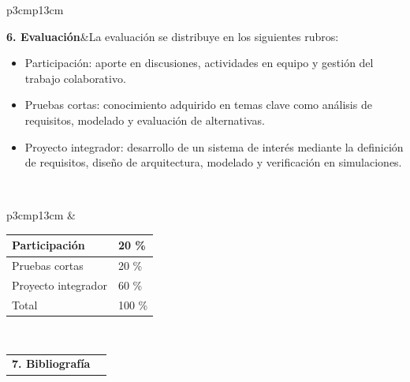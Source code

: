 \documentclass[letterpaper]{article}%
\begin{document}
\begin{tabularx}{\textwidth}{p{3cm}p{13cm}}%
\par\fontsize{12}{14}\selectfont \textbf{\textcolor{parte}{6. Evaluación}}&La evaluación se distribuye en los siguientes rubros:\vspace*{1mm} \newline  \begin{itemize} \item Participación: aporte en discusiones, actividades en equipo y gestión del trabajo colaborativo. \item Pruebas cortas: conocimiento adquirido en temas clave como análisis de requisitos, modelado y evaluación de alternativas. \item Proyecto integrador: desarrollo de un sistema de interés mediante la definición de requisitos, diseño de arquitectura, modelado y verificación en simulaciones. \end{itemize}\\%
\end{tabularx}%
\newline%
\begin{tabularx}{\textwidth}{p{3cm}p{13cm}}%
& \begin{minipage}{\linewidth}  \centering \vspace*{4mm}  \begin{tabular}{ p{4cm}  p{1.5cm} }  \toprule  Participación & 20 \% \\  \midrule  Pruebas cortas & 20 \% \\  \midrule  Proyecto integrador & 60 \% \\  \midrule Total & 100 \% \\  \bottomrule  \end{tabular} \end{minipage} \\%
\end{tabularx}%
\vspace*{4mm}%
\newline%
\begin{tabularx}{\textwidth}{p{3cm}p{13cm}}%
\par\fontsize{12}{14}\selectfont \textbf{\textcolor{parte}{7. Bibliografía}}&
\nocite{incose2023}
\printbibliography[heading=none]\\%
\end{tabularx}%
\vspace*{4mm}%
\newline%
\end{document}
